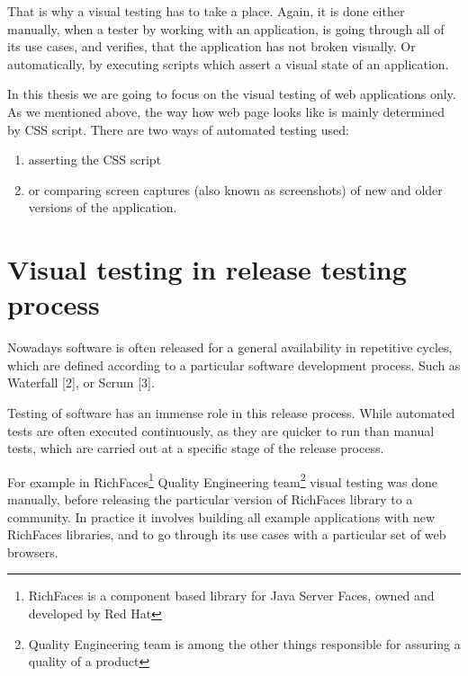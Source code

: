 \documentclass[11pt,oneside,final]{fithesis2}
\begin{document}
    That is why a visual testing has to take a place. Again, it is done either manually, when a tester by working with an application, is going through all of its use cases, and verifies, that
    the application has not broken visually. Or automatically, by executing scripts which assert a visual state of an application.
    
    In this thesis we are going to focus on the visual testing of web applications only. As we mentioned above, the way how web page looks like is mainly determined by CSS script.
    There are two ways of automated testing used:
    \begin{enumerate}
      \item asserting the CSS script
      \item or comparing screen captures (also known as screenshots) of new and older versions of the application.
    \end{enumerate}
     
  \section{Visual testing in release testing process}
  \label{sec:visual-testing-in-release-process}
  Nowadays software is often released for a general availability in repetitive cycles, which are defined according to a particular software development process. 
  Such as Waterfall [2], or Scrum [3].
  
  Testing of software has an immense role in this release process. While automated tests are often executed continuously, as they are quicker to run than manual tests, 
  which are carried out at a specific stage of the release process.
  
  For example in RichFaces\footnote{RichFaces is a component based library for Java Server Faces, owned and developed by Red Hat} Quality Engineering 
  team\footnote{Quality Engineering team is among the other things responsible for assuring a quality of a product} visual testing was done manually, before releasing 
  the particular version of RichFaces library to a community. In practice it involves building all example applications with new RichFaces libraries, and to go 
  through its use cases with a particular set of web browsers. 
  
\end{document}

